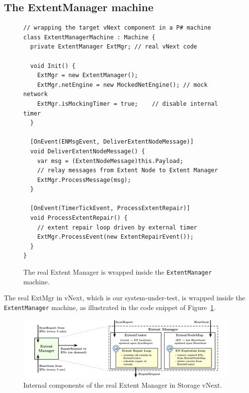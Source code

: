 \subsection{The ExtentManager machine}
\label{sec:method:wrap_target}

\begin{figure}[t]
\begin{lstlisting}
// wrapping the target vNext component in a P# machine
class ExtentManagerMachine : Machine {
  private ExtentManager ExtMgr; // real vNext code

  void Init() {
    ExtMgr = new ExtentManager();
    ExtMgr.netEngine = new MockedNetEngine(); // mock network
    ExtMgr.isMockingTimer = true;	 // disable internal timer
  }

  [OnEvent(ENMsgEvent, DeliverExtentNodeMessage)]
  void DeliverExtentNodeMessage() {
    var msg = (ExtentNodeMessage)this.Payload;
    // relay messages from Extent Node to Extent Manager
    ExtMgr.ProcessMessage(msg);
  }
	
  [OnEvent(TimerTickEvent, ProcessExtentRepair)]
  void ProcessExtentRepair() {
    // extent repair loop driven by external timer
    ExtMgr.ProcessEvent(new ExtentRepairEvent());
  }
}
\end{lstlisting}
\vspace{-3mm}
\caption{The real Extent Manager is wrapped inside the \texttt{ExtentManager} \psharp machine.}
\label{fig:wrap_target}
\end{figure}

The real ExtMgr in vNext, which is our system-under-test, is wrapped inside the \texttt{ExtentManager} machine, as illustrated in the code snippet of Figure~\ref{fig:wrap_target}.

\begin{figure}[t]
\centering
\includegraphics[width=.9\linewidth]{img/extent_manager}
\caption{Internal components of the real Extent Manager in \Azure Storage vNext.}
\label{fig:extentmanager}
\vspace{-5mm}
\end{figure}

